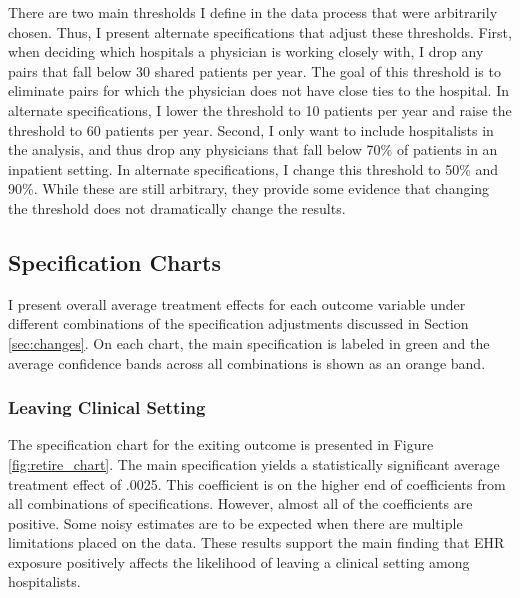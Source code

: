 \documentclass[12pt]{article}
\begin{document}
There are two main thresholds I define in the data process that were arbitrarily chosen. Thus, I present alternate specifications that adjust these thresholds. First, when deciding which hospitals a physician is working closely with, I drop any pairs that fall below 30 shared patients per year. The goal of this threshold is to eliminate pairs for which the physician does not have close ties to the hospital. In alternate specifications, I lower the threshold to 10 patients per year and raise the threshold to 60 patients per year. Second, I only want to include hospitalists in the analysis, and thus drop any physicians that fall below 70\% of patients in an inpatient setting. In alternate specifications, I change this threshold to 50\% and 90\%. While these are still arbitrary, they provide some evidence that changing the threshold does not dramatically change the results. 


\subsection{Specification Charts}\label{sec:chart}

I present overall average treatment effects for each outcome variable under different combinations of the specification adjustments discussed in Section \ref{sec:changes}. On each chart, the main specification is labeled in green and the average confidence bands across all combinations is shown as an orange band. 

\subsubsection{Leaving Clinical Setting}

The specification chart for the exiting outcome is presented in Figure \ref{fig:retire_chart}. The main specification yields a statistically significant average treatment effect of .0025. This coefficient is on the higher end of coefficients from all combinations of specifications. However, almost all of the coefficients are positive. Some noisy estimates are to be expected when there are multiple limitations placed on the data. These results support the main finding that EHR exposure positively affects the likelihood of leaving a clinical setting among hospitalists. 
\end{document}
